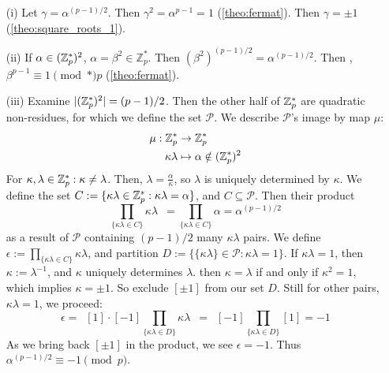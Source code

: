 \begin{Proof}

    \begin{enumerate}
        \item [(i)] Let $\gamma=\alpha^{(p-1)/2}$. Then $\gamma^2=\alpha^{p-1}=1$ (\ref{theo:fermat}). Then $\gamma=\pm1$ (\ref{theo:square_roots_1}).
        \item[(ii)] If $\alpha\in(\mathbb{Z}_p^*)^2$, $\alpha=\beta^2\in\mathbb{Z}_p^*$. Then $(\beta^2)^{(p-1)/2}=\alpha^{(p-1)/2}$.
        Then , $\beta^{p-1}\equiv 1 \pmod*{p}$ (\ref{theo:fermat}).
        \item[(iii)] Examine $|(\mathbb{Z}_p^*)^2|=(p-1)/2$. Then the other half of $\mathbb{Z}_p^*$ are quadratic non-residues, for which we define the set $\mathcal{P}$.
                     We describe $\mathcal{P}$'s image by map $\mu$:
                        \begin{align*}
                            \mu: \mathbb{Z}_p^* &\to \mathbb{Z}_p^*\\
                            \kappa\lambda &\mapsto \alpha\notin(\mathbb{Z}_p^*)^2
                        \end{align*}
                        For $\kappa,\lambda\in\mathbb{Z}_p^*:\kappa\neq\lambda$. Then, $\lambda=\frac{\alpha}{\kappa}$, so $\lambda$ is uniquely determined by $\kappa$.
                        We define the set $C:=\{\kappa\lambda\in\mathbb{Z}_p^*:\kappa\lambda=\alpha\}$, and $C\subseteq\mathcal{P}$. Then their product
                        \[\prod_{\{\kappa\lambda\in C\}}\kappa\lambda\enspace=\prod_{\{\kappa\lambda\in C\}}\alpha=\alpha^{(p-1)/2}\]
                        as a result of $\mathcal{P}$ containing $(p-1)/2$ many $\kappa\lambda$ pairs. We define $\epsilon:=\prod_{\{\kappa\lambda\in C\}}\kappa\lambda$,
                        and partition $D:=\{\{\kappa\lambda\}\in\mathcal{P}:\kappa\lambda=1\}$. If $\kappa\lambda=1$, then $\kappa:=\lambda^{-1}$, and $\kappa$ uniquely determines $\lambda$.
                        then $\kappa=\lambda$ if and only if $\kappa^2=1$, which implies $\kappa=\pm1$. So exclude $[\pm1]$ from our set $D$. Still for other pairs, $\kappa\lambda=1$, we proceed:
                        \[\epsilon=\enspace[1]\cdot[-1]\prod_{\{\kappa\lambda\in D\}}\kappa\lambda\enspace=\enspace[-1]\prod_{\{\kappa\lambda\in D\}}[1]=-1\]
                        As we bring back $[\pm1]$ in the product, we see $\epsilon=-1$. Thus $\alpha^{(p-1)/2}\equiv -1\pmod{p}$.
    \end{enumerate} 

\end{Proof}
